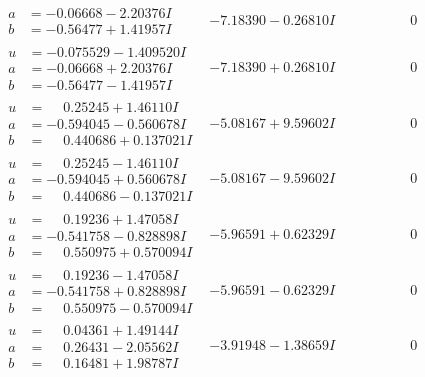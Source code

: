 \documentclass[1p]{elsarticle_modified}
\theoremstyle{definition}
\begin{document}
$$\begin{array}{c|c|c}
\begin{aligned}
a &= -0.06668 - 2.20376 I \\
b &= -0.56477 + 1.41957 I\end{aligned}
 & -7.18390 - 0.26810 I & \phantom{-0.000000 } 0 \\ \hline\begin{aligned}
u &= -0.075529 - 1.409520 I \\
a &= -0.06668 + 2.20376 I \\
b &= -0.56477 - 1.41957 I\end{aligned}
 & -7.18390 + 0.26810 I & \phantom{-0.000000 } 0 \\ \hline\begin{aligned}
u &= \phantom{-}0.25245 + 1.46110 I \\
a &= -0.594045 - 0.560678 I \\
b &= \phantom{-}0.440686 + 0.137021 I\end{aligned}
 & -5.08167 + 9.59602 I & \phantom{-0.000000 } 0 \\ \hline\begin{aligned}
u &= \phantom{-}0.25245 - 1.46110 I \\
a &= -0.594045 + 0.560678 I \\
b &= \phantom{-}0.440686 - 0.137021 I\end{aligned}
 & -5.08167 - 9.59602 I & \phantom{-0.000000 } 0 \\ \hline\begin{aligned}
u &= \phantom{-}0.19236 + 1.47058 I \\
a &= -0.541758 - 0.828898 I \\
b &= \phantom{-}0.550975 + 0.570094 I\end{aligned}
 & -5.96591 + 0.62329 I & \phantom{-0.000000 } 0 \\ \hline\begin{aligned}
u &= \phantom{-}0.19236 - 1.47058 I \\
a &= -0.541758 + 0.828898 I \\
b &= \phantom{-}0.550975 - 0.570094 I\end{aligned}
 & -5.96591 - 0.62329 I & \phantom{-0.000000 } 0 \\ \hline\begin{aligned}
u &= \phantom{-}0.04361 + 1.49144 I \\
a &= \phantom{-}0.26431 - 2.05562 I \\
b &= \phantom{-}0.16481 + 1.98787 I\end{aligned}
 & -3.91948 - 1.38659 I & \phantom{-0.000000 } 0 \\ \hline\begin{aligned}

\end{aligned}
\end{array}$$
\end{document}
